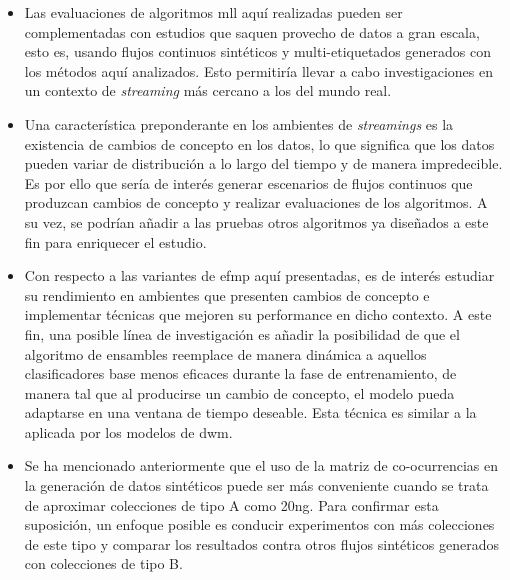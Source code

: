 \begin{itemize}

	\item Las evaluaciones de algoritmos \acrshort{mll} aquí realizadas pueden
	      ser complementadas con estudios que saquen provecho de datos a gran
	      escala, esto es, usando flujos continuos sintéticos y multi-etiquetados
	      generados con los métodos aquí analizados. Esto permitiría llevar a cabo
	      investigaciones en un contexto de \textit{streaming} más cercano a los
	      del mundo real.

	\item Una característica preponderante en los ambientes de
	      \textit{streamings} es la existencia de cambios de concepto en los
	      datos, lo que significa que los datos pueden variar de distribución a
	      lo largo del tiempo y de manera impredecible. Es por ello que sería de
	      interés generar escenarios de flujos continuos que produzcan cambios
	      de concepto y realizar evaluaciones de los algoritmos. A su vez, se
	      podrían añadir a las pruebas otros algoritmos ya diseñados a este fin
	      para enriquecer el estudio.

	\item Con respecto a las variantes de \acrshort{efmp} aquí presentadas, es
	      de interés estudiar su rendimiento en ambientes que presenten cambios
	      de concepto e implementar técnicas que mejoren su performance en dicho
	      contexto. A este fin, una posible línea de investigación es añadir la
	      posibilidad de que el algoritmo de ensambles reemplace de manera
	      dinámica a aquellos clasificadores base menos eficaces durante la fase
	      de entrenamiento, de manera tal que al producirse un cambio de
	      concepto, el modelo pueda adaptarse en una ventana de tiempo deseable.
	      Esta técnica es similar a la aplicada por los modelos de
	      \acrshort{dwm}.

	\item Se ha mencionado anteriormente que el uso de la matriz de
	      co-ocurrencias en la generación de datos sintéticos puede ser más
	      conveniente cuando se trata de aproximar colecciones de tipo A como
	      20ng. Para confirmar esta suposición, un enfoque posible es conducir
	      experimentos con más colecciones de este tipo y comparar los resultados
	      contra otros flujos sintéticos generados con colecciones de tipo B.


\end{itemize}
